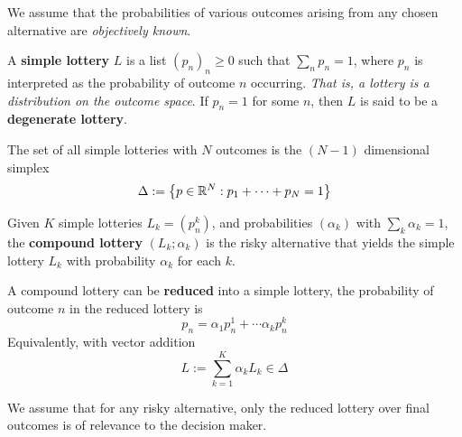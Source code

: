 \documentclass{report}
\begin{document}
	 		\begin{assumption}
	 			We assume that the probabilities of various outcomes arising from any chosen alternative are \emph{objectively known}.
	 		\end{assumption}
	 		
	 		\begin{definition}[6.B.1]
	 			A \textbf{simple lottery} $L$ is a list $(p_n)_n \geq 0$ such that $\sum_n p_n = 1$, where $p_n$ is interpreted as the probability of outcome $n$ occurring. \emph{That is, a lottery is a distribution on the outcome space}. If $p_n = 1$ for some $n$, then $L$ is said to be a \textbf{degenerate lottery}.
	 		\end{definition}
	 		
	 		\begin{remark}
	 			The set of all simple lotteries with $N$ outcomes is the $(N-1)$ dimensional simplex
	 			\begin{equation}
	 				\Delta := \left\{p \in \mathbb{R}^N: p_1 + \cdots + p_N = 1 \right\}
	 			\end{equation}
	 		\end{remark}
	 		
	 		\begin{definition}[6.B.2]
	 			Given $K$ simple lotteries $L_k = (p_n^k)$, and probabilities $(\alpha_k)$ with $\sum_k \alpha_k = 1$, the \textbf{compound lottery} $(L_k; \alpha_k)$ is the risky alternative that yields the simple lottery $L_k$ with probability $\alpha_k$ for each $k$.
	 		\end{definition}
	 		
	 		\begin{proposition}
	 			A compound lottery can be \textbf{reduced} into a simple lottery, the probability of outcome $n$ in the reduced lottery is
	 			\begin{equation}
	 				p_n = \alpha_1 p_n^1 + \cdots \alpha_k p_n^k
	 			\end{equation}
	 			Equivalently, with vector addition
	 			\begin{equation}
	 				L := \sum_{k=1}^K \alpha_k L_k \in \Delta
	 			\end{equation}
	 		\end{proposition}
	 		
	 		\begin{assumption}
	 			We assume that for any risky alternative, only the reduced lottery over final outcomes is of relevance to the decision maker.
	 		\end{assumption}
	 		
\end{document}
